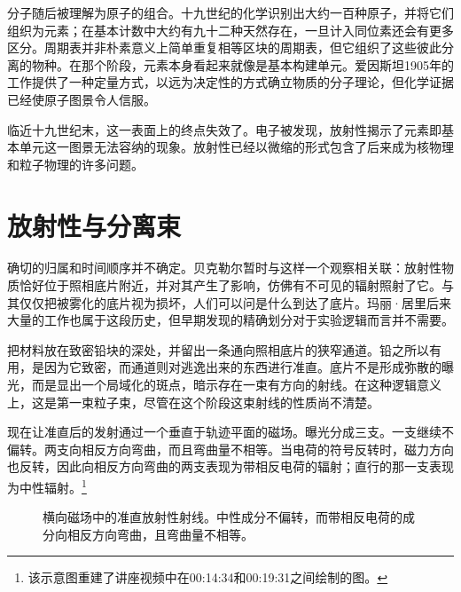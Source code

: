 分子随后被理解为原子的组合。十九世纪的化学识别出大约一百种原子，并将它们组织为元素；在基本计数中大约有九十二种天然存在，一旦计入同位素还会有更多区分。周期表并非朴素意义上简单重复相等区块的周期表，但它组织了这些彼此分离的物种。在那个阶段，元素本身看起来就像是基本构建单元。爱因斯坦1905年的工作提供了一种定量方式，以远为决定性的方式确立物质的分子理论，但化学证据已经使原子图景令人信服。

临近十九世纪末，这一表面上的终点失效了。电子被发现，放射性揭示了元素即基本单元这一图景无法容纳的现象。放射性已经以微缩的形式包含了后来成为核物理和粒子物理的许多问题。

\section{放射性与分离束}

确切的归属和时间顺序并不确定。贝克勒尔暂时与这样一个观察相关联：放射性物质恰好位于照相底片附近，并对其产生了影响，仿佛有不可见的辐射照射了它。与其仅仅把被雾化的底片视为损坏，人们可以问是什么到达了底片。玛丽·居里后来大量的工作也属于这段历史，但早期发现的精确划分对于实验逻辑而言并不需要。

把材料放在致密铅块的深处，并留出一条通向照相底片的狭窄通道。铅之所以有用，是因为它致密，而通道则对逃逸出来的东西进行准直。底片不是形成弥散的曝光，而是显出一个局域化的斑点，暗示存在一束有方向的射线。在这种逻辑意义上，这是第一束粒子束，尽管在这个阶段这束射线的性质尚不清楚。

现在让准直后的发射通过一个垂直于轨迹平面的磁场。曝光分成三支。一支继续不偏转。两支向相反方向弯曲，而且弯曲量不相等。当电荷的符号反转时，磁力方向也反转，因此向相反方向弯曲的两支表现为带相反电荷的辐射；直行的那一支表现为中性辐射。\footnote{该示意图重建了讲座视频中在00:14:34和00:19:31之间绘制的图。}

\begin{figure}[h]
\centering
{}
\caption{横向磁场中的准直放射性射线。中性成分不偏转，而带相反电荷的成分向相反方向弯曲，且弯曲量不相等。}
\end{figure}

